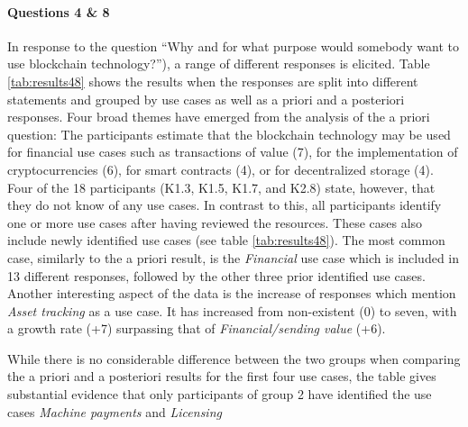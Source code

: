 \paragraph{Questions 4 \& 8} In response to the question \enquote{Why and for what purpose would somebody want to use blockchain technology?}), a range of different responses is elicited. Table \ref{tab:results48} shows the results when the responses are split into different statements and grouped by use cases as well as a priori and a posteriori responses.
Four broad themes have emerged from the analysis of the a priori question: The participants estimate that the blockchain technology may be used for financial use cases such as transactions of value (7), for the implementation of cryptocurrencies (6), for smart contracts (4), or for decentralized storage (4). Four of the 18 participants (K1.3, K1.5, K1.7, and K2.8) state, however, that they do not know of any use cases. In contrast to this, all participants identify one or more use cases after having reviewed the resources. These cases also include newly identified use cases (see table \ref{tab:results48}). The most common case, similarly to the a priori result, is the \textit{Financial} use case which is included in 13 different responses, followed by the other three prior identified use cases.
Another interesting aspect of the data is the increase of responses which mention \textit{Asset tracking} as a use case. It has increased from non-existent (0) to seven, with a growth rate (+7) surpassing that of \textit{Financial/sending value} (+6).

While there is no considerable difference between the two groups when comparing the a priori and a posteriori results for the first four use cases, the table gives substantial evidence that only participants of group 2 have identified the use cases \textit{Machine payments} and \textit{Licensing}

